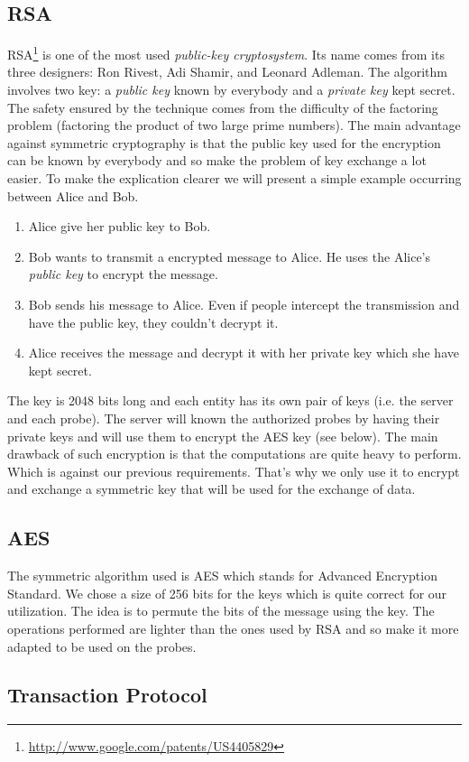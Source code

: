 \subsection{RSA}
RSA\footnote{\url{http://www.google.com/patents/US4405829}} is one of the most used \emph{public-key cryptosystem}. Its name comes from its three designers: Ron Rivest, Adi Shamir, and Leonard Adleman. The algorithm involves two key: a \emph{public key} known by everybody and a \emph{private key} kept secret. The safety ensured by the technique comes from the difficulty of the factoring problem (factoring the product of two large prime numbers).
The main advantage against symmetric cryptography is that the public key used for the encryption can be known by everybody and so make the problem of key exchange a lot easier. To make the explication clearer we will present a simple example occurring between Alice and Bob.
\begin{enumerate}
\item Alice give her public key to Bob.
\item Bob wants to transmit a encrypted message to Alice. He uses the Alice's \emph{public key} to encrypt the message.
\item Bob sends his message to Alice. Even if people intercept the transmission and have the public key, they couldn't decrypt it.
\item Alice receives the message and decrypt it with her private key which she have kept secret.
\end{enumerate}
The key is 2048 bits long and each entity has its own pair of keys (i.e. the server and each probe). The server will known the authorized probes by having their private keys and will use them to encrypt the AES key (see below).
The main drawback of such encryption is that the computations are quite heavy to perform. Which is against our previous requirements. That's why we only use it to encrypt and exchange a symmetric key that will be used for the exchange of data.
\subsection{AES}
The symmetric algorithm used is AES which stands for Advanced Encryption Standard. We chose a size of 256 bits for the keys which is quite correct for our utilization. The idea is to permute the bits of the message using the key. The operations performed are lighter than the ones used by RSA and so make it more adapted to be used on the probes.
\subsection{Transaction Protocol}
